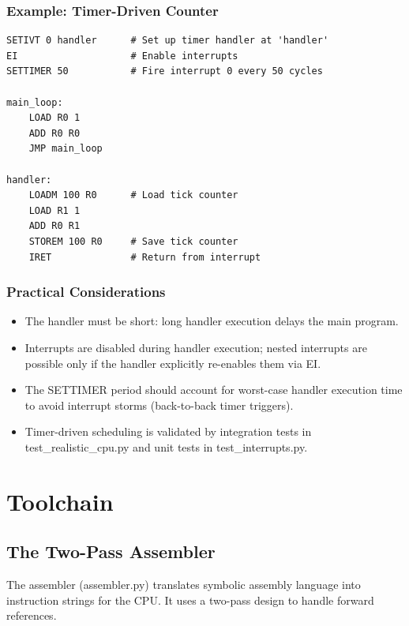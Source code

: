 \documentclass[12pt,a4paper,twoside]{book}
\theoremstyle{trinarytheorem}
\theoremstyle{trinarydefinition}
\newcommand{\code}[1]{\textsf{#1}}
\begin{document}
\section{Example: Timer-Driven Counter}

\begin{lstlisting}
SETIVT 0 handler      # Set up timer handler at 'handler'
EI                    # Enable interrupts
SETTIMER 50           # Fire interrupt 0 every 50 cycles

main_loop:
    LOAD R0 1
    ADD R0 R0
    JMP main_loop

handler:
    LOADM 100 R0      # Load tick counter
    LOAD R1 1
    ADD R0 R1
    STOREM 100 R0     # Save tick counter
    IRET              # Return from interrupt
\end{lstlisting}

\section{Practical Considerations}

\begin{itemize}
    \item The handler must be short: long handler execution delays the main program.
    \item Interrupts are disabled during handler execution; nested interrupts are
          possible only if the handler explicitly re-enables them via EI.
    \item The SETTIMER period should account for worst-case handler execution time
          to avoid interrupt storms (back-to-back timer triggers).
    \item Timer-driven scheduling is validated by integration tests in
          \code{test\_realistic\_cpu.py} and unit tests in \code{test\_interrupts.py}.
\end{itemize}

\part{Toolchain}

\chapter{The Two-Pass Assembler}
\label{ch:assembler}

The assembler (\code{assembler.py}) translates symbolic assembly language into
instruction strings for the CPU. It uses a two-pass design to handle forward references.
\end{document}
